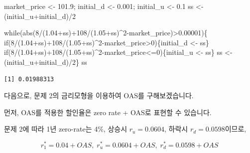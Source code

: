\documentclass[
  letterpaper,
  DIV=11,
  numbers=noendperiod]{scrreprt}
\newenvironment{Shaded}{\begin{snugshade}}{\end{snugshade}}
\newcommand{\ControlFlowTok}[1]{\textcolor[rgb]{0.00,0.23,0.31}{#1}}
\newcommand{\DecValTok}[1]{\textcolor[rgb]{0.68,0.00,0.00}{#1}}
\newcommand{\FloatTok}[1]{\textcolor[rgb]{0.68,0.00,0.00}{#1}}
\newcommand{\FunctionTok}[1]{\textcolor[rgb]{0.28,0.35,0.67}{#1}}
\newcommand{\NormalTok}[1]{\textcolor[rgb]{0.00,0.23,0.31}{#1}}
\newcommand{\OtherTok}[1]{\textcolor[rgb]{0.00,0.23,0.31}{#1}}
\newcommand{\SpecialCharTok}[1]{\textcolor[rgb]{0.37,0.37,0.37}{#1}}
\begin{document}
\begin{Shaded}
\begin{Highlighting}[]
\NormalTok{market\_price }\OtherTok{\textless{}{-}} \FloatTok{101.9}\NormalTok{; initial\_d }\OtherTok{\textless{}{-}} \FloatTok{0.001}\NormalTok{; initial\_u }\OtherTok{\textless{}{-}} \FloatTok{0.1}
\NormalTok{ss }\OtherTok{\textless{}{-}}\NormalTok{ (initial\_u}\SpecialCharTok{+}\NormalTok{initial\_d)}\SpecialCharTok{/}\DecValTok{2}

\ControlFlowTok{while}\NormalTok{(}\FunctionTok{abs}\NormalTok{(}\DecValTok{8}\SpecialCharTok{/}\NormalTok{(}\FloatTok{1.04}\SpecialCharTok{+}\NormalTok{ss)}\SpecialCharTok{+}\DecValTok{108}\SpecialCharTok{/}\NormalTok{(}\FloatTok{1.05}\SpecialCharTok{+}\NormalTok{ss)}\SpecialCharTok{\^{}}\DecValTok{2}\SpecialCharTok{{-}}\NormalTok{market\_price)}\SpecialCharTok{\textgreater{}}\FloatTok{0.00001}\NormalTok{)\{}
  \ControlFlowTok{if}\NormalTok{(}\DecValTok{8}\SpecialCharTok{/}\NormalTok{(}\FloatTok{1.04}\SpecialCharTok{+}\NormalTok{ss)}\SpecialCharTok{+}\DecValTok{108}\SpecialCharTok{/}\NormalTok{(}\FloatTok{1.05}\SpecialCharTok{+}\NormalTok{ss)}\SpecialCharTok{\^{}}\DecValTok{2}\SpecialCharTok{{-}}\NormalTok{market\_price}\SpecialCharTok{\textgreater{}}\DecValTok{0}\NormalTok{)\{initial\_d }\OtherTok{\textless{}{-}}\NormalTok{ ss\}}
  \ControlFlowTok{if}\NormalTok{(}\DecValTok{8}\SpecialCharTok{/}\NormalTok{(}\FloatTok{1.04}\SpecialCharTok{+}\NormalTok{ss)}\SpecialCharTok{+}\DecValTok{108}\SpecialCharTok{/}\NormalTok{(}\FloatTok{1.05}\SpecialCharTok{+}\NormalTok{ss)}\SpecialCharTok{\^{}}\DecValTok{2}\SpecialCharTok{{-}}\NormalTok{market\_price}\SpecialCharTok{\textless{}=}\DecValTok{0}\NormalTok{)\{initial\_u }\OtherTok{\textless{}{-}}\NormalTok{ ss\}}
\NormalTok{  ss }\OtherTok{\textless{}{-}}\NormalTok{ (initial\_u}\SpecialCharTok{+}\NormalTok{initial\_d)}\SpecialCharTok{/}\DecValTok{2}\NormalTok{\}}
\NormalTok{ss}
\end{Highlighting}
\end{Shaded}

\begin{verbatim}
[1] 0.01988313
\end{verbatim}

다음으로, 문제 2의 금리모형을 이용하여 OAS를 구해보겠습니다.

먼저, OAS를 적용한 할인율은 zero rate + OAS로 표현할 수 있습니다.

문제 2에 따라 1년 zero-rate는 4\%, 상승시 \(r_u=0.0604\), 하락시
\(r_d=0.0598\)이므로,

\[r^*_1=0.04+OAS,\;r^*_u=0.0604+OAS,\;r_d^*=0.0598+OAS\]
\end{document}
